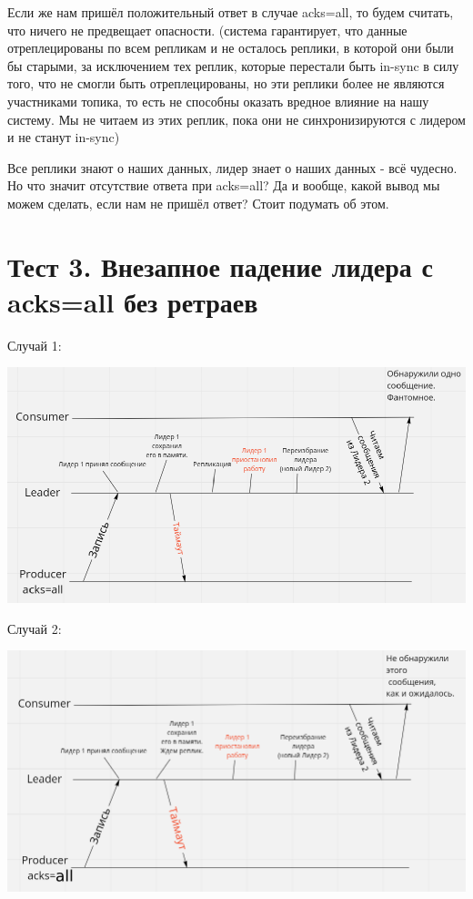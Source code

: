 \documentclass[11pt]{article}
\begin{document}
    Если же нам пришёл положительный ответ в случае acks=all, то будем считать, что ничего не предвещает опасности. (система гарантирует, что данные отреплецированы по всем репликам и не осталось реплики, в которой они были бы старыми, за исключением тех реплик, которые перестали быть in-sync в силу того, что не смогли быть отреплецированы, но эти реплики более не являются участниками топика, то есть не способны оказать вредное влияние на нашу систему. Мы не читаем из этих реплик, пока они не синхронизируются с лидером и не станут in-sync)

    Все реплики знают о наших данных, лидер знает о наших данных - всё чудесно. Но что значит отсутствие ответа при acks=all? Да и вообще, какой вывод мы можем сделать, если нам не пришёл ответ? Стоит подумать об этом.
    \newpage

    \section{Тест 3. Внезапное падение лидера с acks=all без ретраев}

    Случай 1:

    \includegraphics[width=15cm]{test3}

    Случай 2:

    \includegraphics[width=15cm]{test333}
\end{document}
